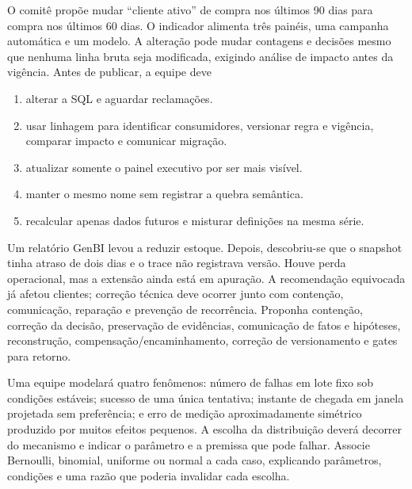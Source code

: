 \documentclass[12pt,a4paper]{article}
\begin{document}
\TextoBase O comitê propõe mudar ``cliente ativo'' de compra nos últimos 90 dias para compra nos últimos 60 dias. O indicador alimenta três painéis, uma campanha automática e um modelo. A alteração pode mudar contagens e decisões mesmo que nenhuma linha bruta seja modificada, exigindo análise de impacto antes da vigência.
\FonteDidatica
\Comando Antes de publicar, a equipe deve
\begin{enumerate}[label=\Alph*)]
  \item alterar a SQL e aguardar reclamações.
  \item usar linhagem para identificar consumidores, versionar regra e vigência, comparar impacto e comunicar migração.
  \item atualizar somente o painel executivo por ser mais visível.
  \item manter o mesmo nome sem registrar a quebra semântica.
  \item recalcular apenas dados futuros e misturar definições na mesma série.
\end{enumerate}

\TextoBase
Um relatório GenBI levou a reduzir estoque. Depois, descobriu-se que o snapshot tinha atraso de dois dias e o trace não registrava versão. Houve perda operacional, mas a extensão ainda está em apuração.
A recomendação equivocada já afetou clientes; correção técnica deve ocorrer junto com contenção, comunicação, reparação e prevenção de recorrência.
\FonteDidatica
\Comando Proponha contenção, correção da decisão, preservação de evidências, comunicação de fatos e hipóteses, reconstrução, compensação/encaminhamento, correção de versionamento e gates para retorno.
\EspacoDiscursiva

\TextoBase Uma equipe modelará quatro fenômenos: número de falhas em lote fixo sob condições estáveis; sucesso de uma única tentativa; instante de chegada em janela projetada sem preferência; e erro de medição aproximadamente simétrico produzido por muitos efeitos pequenos. A escolha da distribuição deverá decorrer do mecanismo e indicar o parâmetro e a premissa que pode falhar.
\FonteDidatica
\Comando Associe Bernoulli, binomial, uniforme ou normal a cada caso, explicando parâmetros, condições e uma razão que poderia invalidar cada escolha.
\EspacoDiscursiva
\end{document}
